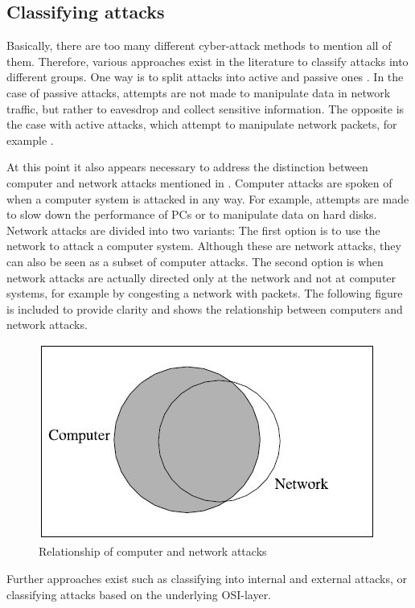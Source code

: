 \documentclass[conference]{IEEEtran}
\begin{document}
\subsection{Classifying attacks}

\medskip Basically, there are too many different cyber-attack methods to mention all of them. Therefore, various approaches exist in the literature to classify attacks into different groups. One way is to split attacks into active and passive ones \cite{b3,b4}.  In the case of passive attacks, attempts are not made to manipulate data in network traffic, but rather to eavesdrop and collect sensitive information. The opposite is the case with active attacks, which attempt to manipulate network packets, for example \cite{b4}. 

At this point it also appears necessary to address the distinction between computer and network attacks mentioned in \cite{b2}. Computer attacks are spoken of when a computer system is attacked in any way. For example, attempts are made to slow down the performance of PCs or to manipulate data on hard disks. Network attacks are divided into two variants: The first option is to use the network to attack a computer system. Although these are network attacks, they can also be seen as a subset of computer attacks. The second option is when network attacks are actually directed only at the network and not at computer systems, for example by congesting a network with packets. The following figure is included to provide clarity and shows the relationship between computers and network attacks.

\begin{figure}[htbp]  
\centerline{\includegraphics{computer-network-attacks.jpg}}
\caption{Relationship of computer and network attacks \cite{b2}}
\end{figure}

\medskip Further approaches exist such as classifying into internal and external attacks, or classifying attacks based on the underlying OSI-layer.
\end{document}
